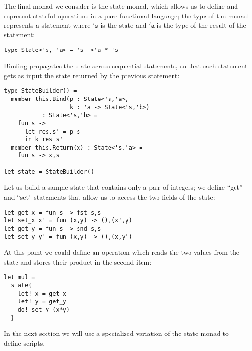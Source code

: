 The final monad we consider is the state monad, which allows us to
define and represent stateful operations in a pure functional
language; the type of the monad represents a statement where
$\mathtt{'s}$ is the state and $\mathtt{'a}$ is the type of the result
of the statement:  
\begin{lstlisting}
type State<'s, 'a> = 's ->'a * 's
\end{lstlisting}

Binding propagates the state across sequential statements, so that
each statement gets as input the state returned by the previous
statement: 
\begin{lstlisting}
type StateBuilder() =         
  member this.Bind(p : State<'s,'a>, 
                   k : 'a -> State<'s,'b>) 
           : State<'s,'b> = 
    fun s ->
      let res,s' = p s
      in k res s'
  member this.Return(x) : State<'s,'a> = 
    fun s -> x,s      

let state = StateBuilder()
\end{lstlisting}

Let us build a sample state that contains only a pair of integers; we
define ``get'' and ``set'' statements  that allow us to access the two
fields of the state: 
\begin{lstlisting}
let get_x = fun s -> fst s,s
let set_x x' = fun (x,y) -> (),(x',y)
let get_y = fun s -> snd s,s
let set_y y' = fun (x,y) -> (),(x,y')
\end{lstlisting}

At this point we could define an operation which reads the two values
from the state and stores their product in the second item: 
\begin{lstlisting}
let mul = 
  state{
    let! x = get_x
    let! y = get_y
    do! set_y (x*y)
  }
\end{lstlisting}

In the next section we will use a specialized variation of the state monad to define scripts.